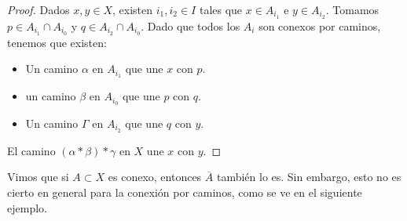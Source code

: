 \begin{proof}
Dados $\displaystyle x,y\in X $, existen $\displaystyle i_{1}, i_{2}\in I $ tales que $\displaystyle x \in A_{i_{1}} $ e $\displaystyle y \in A_{i_{2}} $. Tomamos $\displaystyle p \in A_{i_{1}}\cap A_{i_{0}} $ y $\displaystyle q \in A_{i_{2}}\cap A_{i_{0}} $. 
Dado que todos los $\displaystyle A_{i} $ son conexos por caminos, tenemos que existen:
\begin{itemize}
\item Un camino $\displaystyle \alpha  $ en $\displaystyle A_{i_{1}} $ que une $\displaystyle x $ con $\displaystyle p $.
\item un camino $\displaystyle \beta  $ en $\displaystyle A_{i_{0}} $ que une $\displaystyle p $ con $\displaystyle q $.
\item Un camino $\displaystyle \Gamma $ en $\displaystyle A_{i_{2}} $ que une $\displaystyle q $ con $\displaystyle y $.
\end{itemize}
El camino $\displaystyle \left(\alpha * \beta \right)* \gamma  $ en $\displaystyle X $ une $\displaystyle x $ con $\displaystyle y $. 
\end{proof}
\begin{observation}
Vimos que si $\displaystyle A \subset X $ es conexo, entonces $\displaystyle \overline{A} $ también lo es. Sin embargo, esto no es cierto en general para la conexión por caminos, como se ve en el siguiente ejemplo.
\end{observation}

